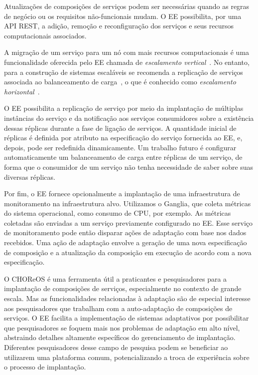 \begin{description}
Atualizações de composições de serviços podem ser necessárias quando
as regras de negócio ou os requisitos não-funcionais mudam.
O EE possibilita, por uma API REST, a adição, remoção e reconfiguração dos serviços
e seus recursos computacionais associados.

A migração de um serviço para um nó com mais recursos computacionais
é uma funcionalidade oferecida pelo EE chamada de \emph{escalamento vertical}~\cite{Pritchett2008Base}.
No entanto, para a construção de sistemas escaláveis se recomenda 
a replicação de serviços associada ao balanceamento de carga~\cite{Amazon2012Practices},
o que é conhecido como \emph{escalamento horizontal}~\cite{Pritchett2008Base}.

O EE possibilita a replicação de serviço por meio da implantação de
múltiplas instâncias do serviço e da notificação aos serviços consumidores
sobre a existência dessas réplicas durante a fase de ligação de serviços.
A quantidade inicial de réplicas é definida por atributo na especificação
do serviço fornecida ao EE, e, depois, pode ser redefinida dinamicamente.
Um trabalho futuro é configurar automaticamente um balanceamento de carga
entre réplicas de um serviço, de forma que o consumidor de um serviço
não tenha necessidade de saber sobre suas diversas réplicas.

Por fim, o EE fornece opcionalmente a implantação de uma infraestrutura de monitoramento na infraestrutura alvo.
Utilizamos o Ganglia, que coleta métricas do sistema operacional, como consumo de CPU, por exemplo.
As métricas coletadas são enviadas a um serviço previamente configurado no EE.
Esse serviço de monitoramento pode então disparar ações de adaptação com base
nos dados recebidos. Uma ação de adaptação envolve a geração de uma nova especificação
de composição e a atualização da composição em execução de acordo com a nova especificação.

O CHOReOS \ee é uma ferramenta útil a praticantes e pesquisadores para
a implantação de composições de serviços, especialmente no contexto de grande escala.
Mas as funcionalidades relacionadas à adaptação são de especial interesse
aos pesquisadores que trabalham com a auto-adaptação de composições de serviços.
O EE facilita a implementação de sistemas adaptativos
por possibilitar que pesquisadores se foquem mais nos problemas de adaptação em
alto nível, abstraindo detalhes altamente específicos do gerenciamento de implantação.
Diferentes pesquisadores desse campo de pesquisa podem se beneficiar ao utilizarem uma plataforma comum,
potencializando a troca de experiência sobre o processo de implantação. 

\end{description}

